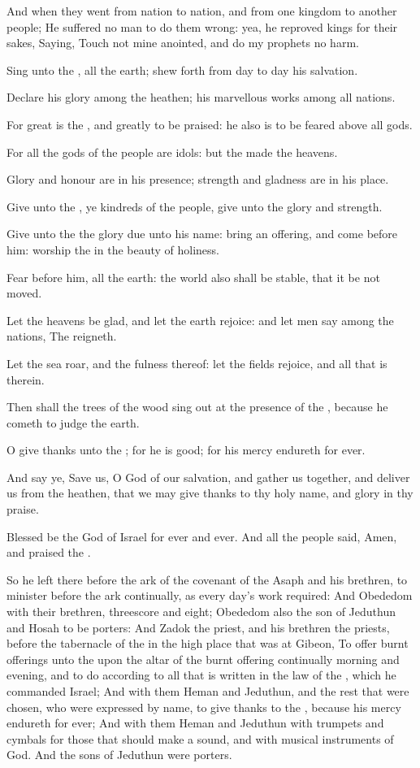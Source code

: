 \Verse And when they went from nation to nation, and from one kingdom to another people; \Verse He suffered no man to do them wrong: yea, he reproved kings for their sakes, \Verse Saying, Touch not mine anointed, and do my prophets no harm.

\Verse Sing unto the \LORD, all the earth; shew forth from day to day his salvation.

\Verse Declare his glory among the heathen; his marvellous works among all nations.

\Verse For great is the \LORD, and greatly to be praised: he also is to be feared above all gods.

\Verse For all the gods of the people are idols: but the \LORD made the heavens.

\Verse Glory and honour are in his presence; strength and gladness are in his place.

\Verse Give unto the \LORD, ye kindreds of the people, give unto the \LORD glory and strength.

\Verse Give unto the \LORD the glory due unto his name: bring an offering, and come before him: worship the \LORD in the beauty of holiness.

\Verse Fear before him, all the earth: the world also shall be stable, that it be not moved.

\Verse Let the heavens be glad, and let the earth rejoice: and let men say among the nations, The \LORD reigneth.

\Verse Let the sea roar, and the fulness thereof: let the fields rejoice, and all that is therein.

\Verse Then shall the trees of the wood sing out at the presence of the \LORD, because he cometh to judge the earth.

\Verse O give thanks unto the \LORD; for he is good; for his mercy endureth for ever.

\Verse And say ye, Save us, O God of our salvation, and gather us together, and deliver us from the heathen, that we may give thanks to thy holy name, and glory in thy praise.

\Verse Blessed be the \LORD God of Israel for ever and ever. And all the people said, Amen, and praised the \LORD.

\Verse So he left there before the ark of the covenant of the \LORD Asaph and his brethren, to minister before the ark continually, as every day's work required: \Verse And Obededom with their brethren, threescore and eight; Obededom also the son of Jeduthun and Hosah to be porters: \Verse And Zadok the priest, and his brethren the priests, before the tabernacle of the \LORD in the high place that was at Gibeon, \Verse To offer burnt offerings unto the \LORD upon the altar of the burnt offering continually morning and evening, and to do according to all that is written in the law of the \LORD, which he commanded Israel; \Verse And with them Heman and Jeduthun, and the rest that were chosen, who were expressed by name, to give thanks to the \LORD, because his mercy endureth for ever; \Verse And with them Heman and Jeduthun with trumpets and cymbals for those that should make a sound, and with musical instruments of God. And the sons of Jeduthun were porters.

